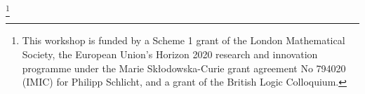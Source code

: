 \documentclass[a4paper]{amsart}
\theoremstyle{remark}
\begin{document}

\newcommand\blfootnote[1]{%
  \begingroup
  \renewcommand\thefootnote{}\footnote{#1}%
  \addtocounter{footnote}{-1}%
  \endgroup
}
\blfootnote{This workshop is funded by a Scheme 1 grant of the London Mathematical Society, the European Union's Horizon 2020 research and innovation programme under the Marie Sk\l odowska-Curie grant agreement No 794020 (IMIC) for Philipp Schlicht, and a grant of the British Logic Colloquium. }




%
%
\end{document}
